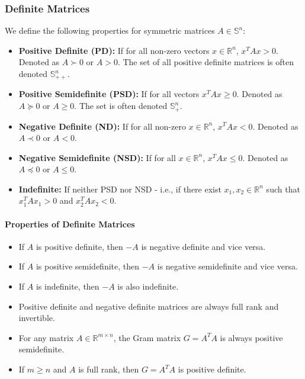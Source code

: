\subsubsection{Definite Matrices}
We define the following properties for symmetric matrices $A \in \mathbb{S}^n$:
\begin{itemize}
    \item \textbf{Positive Definite (PD):} If for all non-zero vectors $x \in \mathbb{R}^n$, $x^T Ax > 0$. Denoted as $A \succ 0$ or $A > 0$. The set of all positive definite matrices is often denoted $\mathbb{S}^n_{++}$.
    
    \item \textbf{Positive Semidefinite (PSD):} If for all vectors $x^T Ax \geq 0$. Denoted as $A \succeq 0$ or $A \geq 0$. The set is often denoted $\mathbb{S}^n_+$.
    
    \item \textbf{Negative Definite (ND):} If for all non-zero $x \in \mathbb{R}^n$, $x^T Ax < 0$. Denoted as $A \prec 0$ or $A < 0$.
    
    \item \textbf{Negative Semidefinite (NSD):} If for all $x \in \mathbb{R}^n$, $x^T Ax \leq 0$. Denoted as $A \preceq 0$ or $A \leq 0$.
    
    \item \textbf{Indefinite:} If neither PSD nor NSD - i.e., if there exist $x_1, x_2 \in \mathbb{R}^n$ such that $x_1^T Ax_1 > 0$ and $x_2^T Ax_2 < 0$.
\end{itemize}

\paragraph{Properties of Definite Matrices}
\begin{itemize}
    \item If $A$ is positive definite, then $-A$ is negative definite and vice versa.
    \item If $A$ is positive semidefinite, then $-A$ is negative semidefinite and vice versa.
    \item If $A$ is indefinite, then $-A$ is also indefinite.
    \item Positive definite and negative definite matrices are always full rank and invertible.
    \item For any matrix $A \in \mathbb{R}^{m\times n}$, the Gram matrix $G = A^T A$ is always positive semidefinite.
    \item If $m \geq n$ and $A$ is full rank, then $G = A^T A$ is positive definite.
\end{itemize}

